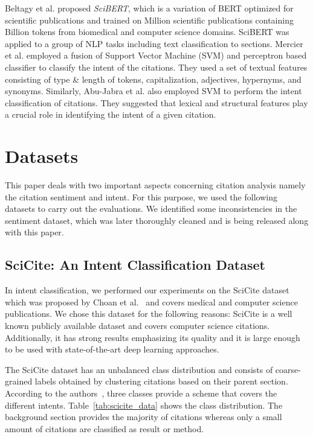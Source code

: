 \documentclass[runningheads]{llncs}
\begin{document}
Beltagy et al. \cite{beltagy-etal-2019-scibert} proposed \textit{SciBERT}, which is a variation of BERT optimized for scientific publications and trained on  Million scientific publications containing  Billion tokens from biomedical and computer science domains. SciBERT was applied to a group of NLP tasks including text classification to sections. Mercier et al. \cite{mercier2019senticite} employed a fusion of Support Vector Machine (SVM) and perceptron based classifier to classify the intent of the citations. They used a set of textual features consisting of type \& length of tokens, capitalization, adjectives, hypernyms, and synonyms. Similarly, Abu-Jabra et al. \cite{abu-jbara-etal-2013-purpose} also employed SVM to perform the intent classification of citations. They suggested that lexical and structural features play a crucial role in identifying the intent of a given citation. 


\section{Datasets}
This paper deals with two important aspects concerning citation analysis namely the citation sentiment and intent. For this purpose, we used the following datasets to carry out the evaluations. We identified some inconsistencies in the sentiment dataset, which was later thoroughly cleaned and is being released along with this paper. 

\subsection{SciCite: An Intent Classification Dataset}
In intent classification, we performed our experiments on the SciCite dataset which was proposed by Choan et al.~\cite{cohan2019structural} and covers medical and computer science publications. We chose this dataset for the following reasons: SciCite is a well known publicly available dataset and covers computer science citations. Additionally, it has strong results emphasizing its quality and it is large enough to be used with state-of-the-art deep learning approaches. 

The SciCite dataset has an unbalanced class distribution and consists of coarse-grained labels obtained by clustering citations based on their parent section. According to the authors~\cite{cohan2019structural}, three classes provide a scheme that covers the different intents. Table~\ref{tab:scicite_data} shows the class distribution. The background section provides the majority of citations whereas only a small amount of citations are classified as result or method.
\end{document}
